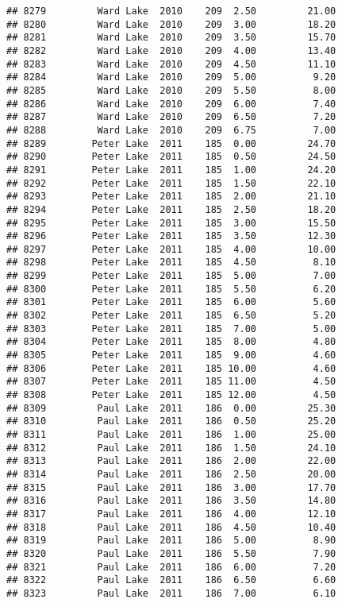 \documentclass[
]{article}
\begin{document}
\begin{verbatim}
## 8279         Ward Lake  2010    209  2.50         21.00
## 8280         Ward Lake  2010    209  3.00         18.20
## 8281         Ward Lake  2010    209  3.50         15.70
## 8282         Ward Lake  2010    209  4.00         13.40
## 8283         Ward Lake  2010    209  4.50         11.10
## 8284         Ward Lake  2010    209  5.00          9.20
## 8285         Ward Lake  2010    209  5.50          8.00
## 8286         Ward Lake  2010    209  6.00          7.40
## 8287         Ward Lake  2010    209  6.50          7.20
## 8288         Ward Lake  2010    209  6.75          7.00
## 8289        Peter Lake  2011    185  0.00         24.70
## 8290        Peter Lake  2011    185  0.50         24.50
## 8291        Peter Lake  2011    185  1.00         24.20
## 8292        Peter Lake  2011    185  1.50         22.10
## 8293        Peter Lake  2011    185  2.00         21.10
## 8294        Peter Lake  2011    185  2.50         18.20
## 8295        Peter Lake  2011    185  3.00         15.50
## 8296        Peter Lake  2011    185  3.50         12.30
## 8297        Peter Lake  2011    185  4.00         10.00
## 8298        Peter Lake  2011    185  4.50          8.10
## 8299        Peter Lake  2011    185  5.00          7.00
## 8300        Peter Lake  2011    185  5.50          6.20
## 8301        Peter Lake  2011    185  6.00          5.60
## 8302        Peter Lake  2011    185  6.50          5.20
## 8303        Peter Lake  2011    185  7.00          5.00
## 8304        Peter Lake  2011    185  8.00          4.80
## 8305        Peter Lake  2011    185  9.00          4.60
## 8306        Peter Lake  2011    185 10.00          4.60
## 8307        Peter Lake  2011    185 11.00          4.50
## 8308        Peter Lake  2011    185 12.00          4.50
## 8309         Paul Lake  2011    186  0.00         25.30
## 8310         Paul Lake  2011    186  0.50         25.20
## 8311         Paul Lake  2011    186  1.00         25.00
## 8312         Paul Lake  2011    186  1.50         24.10
## 8313         Paul Lake  2011    186  2.00         22.00
## 8314         Paul Lake  2011    186  2.50         20.00
## 8315         Paul Lake  2011    186  3.00         17.70
## 8316         Paul Lake  2011    186  3.50         14.80
## 8317         Paul Lake  2011    186  4.00         12.10
## 8318         Paul Lake  2011    186  4.50         10.40
## 8319         Paul Lake  2011    186  5.00          8.90
## 8320         Paul Lake  2011    186  5.50          7.90
## 8321         Paul Lake  2011    186  6.00          7.20
## 8322         Paul Lake  2011    186  6.50          6.60
## 8323         Paul Lake  2011    186  7.00          6.10

\end{verbatim}
\end{document}
